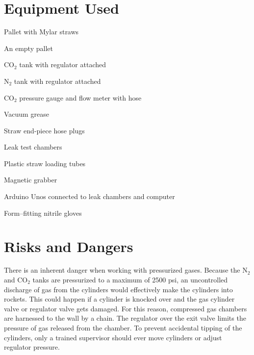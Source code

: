 \documentclass[letterpaper,12pt]{article}
\begin{document}

\section{Equipment Used}
\begin{multicols}{2}
\begin{myitemize}
	\item Pallet with Mylar straws
	\item An empty pallet
	\item CO$_2$ tank with regulator attached
	\item N$_2$ tank with regulator attached
	\item CO$_2$ pressure gauge and flow meter with hose 
	\item Vacuum grease
	\item Straw end-piece hose plugs
	\item Leak test chambers
	\item Plastic straw loading tubes
	\item Magnetic grabber
	\item Arduino Unos connected to leak chambers and computer
	\item Form--fitting nitrile gloves
\end{myitemize}
\end{multicols}


\section{Risks and Dangers}
There is an inherent danger when working with pressurized gases. Because the N$_2$ and CO$_2$ tanks are pressurized to a maximum of 2500 psi, an uncontrolled discharge of gas from the cylinders would effectively make the cylinders into rockets. This could happen if a cylinder is knocked over and the gas cylinder valve or regulator valve gets damaged. For this reason, compressed gas chambers are harnessed to the wall by a chain. The regulator over the exit valve limits the pressure of gas released from the chamber. To prevent accidental tipping of the cylinders, only a trained supervisor should ever move cylinders or adjust regulator pressure. 
\end{document}
